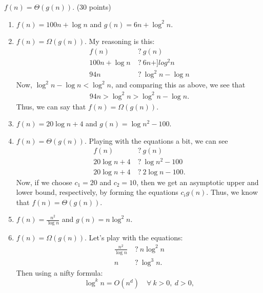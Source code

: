\documentclass{article}
\begin{document}
$f (n) = \Theta(g(n))$. (30 points)
\begin{enumerate}[label=(\alph*)]
\item $f (n) = 100n + \log n$ and $g(n) = 6n + \log^2 n$.
\item[] $f(n) = \Omega(g(n))$.  My reasoning is this:
  \begin{equation}
    \begin{split}
      f(n) &\: ?\: g(n)\\
      100n + \log n &\: ? \: 6n+]log^2 n\\
      94n &\: ?\: \log^2 n - \log n 
    \end{split}
  \end{equation}
Now, $\log^2 n - \log n < \log^2 n$, and comparing this as above, we
see that 
\begin{equation}
  \begin{split}
    94n > \log^2 n > \log^2 n -\log n.
  \end{split}
\end{equation}
Thus, we can say that $f(n) = \Omega(g(n))$.
\item $f (n) = 20 \log n + 4$ and $g(n) = \log n^2 - 100$.
\item[] $f(n) = \Theta(g(n))$.  Playing with the equations a bit, we
  can see
  \begin{equation}
    \begin{split}
      f(n) & \: ? \: g(n)\\
      20\log n + 4 &\: ? \: \log n^2 - 100\\
      20 \log n + 4 &\: ? \: 2\log n - 100.
    \end{split}
  \end{equation}
Now, if we choose $c_1 = 20$ and $c_2 = 10$, then we get an asymptotic
upper and lower bound, respectively, by forming the equations $c_i
g(n)$.  Thus, we know that $f(n) = \Theta(g(n))$.
\item $f (n) =\frac{n^2}{\log n}$ and $g(n) = n \log^2 n$.
\item[] $f(n) = \Omega(g(n))$. Let's play with the equations:
  \begin{equation}
    \begin{split}
      \frac{n^2}{\log n} &\: ? \: n \log^2 n\\
      n &\: ? \: \log^3 n.
    \end{split}
  \end{equation}
Then using a nifty formula:
  \begin{equation}
    \log^k n = O(n^d) \quad \forall\: k>0, \: d > 0,

\end{equation}
\end{enumerate}
\end{document}
